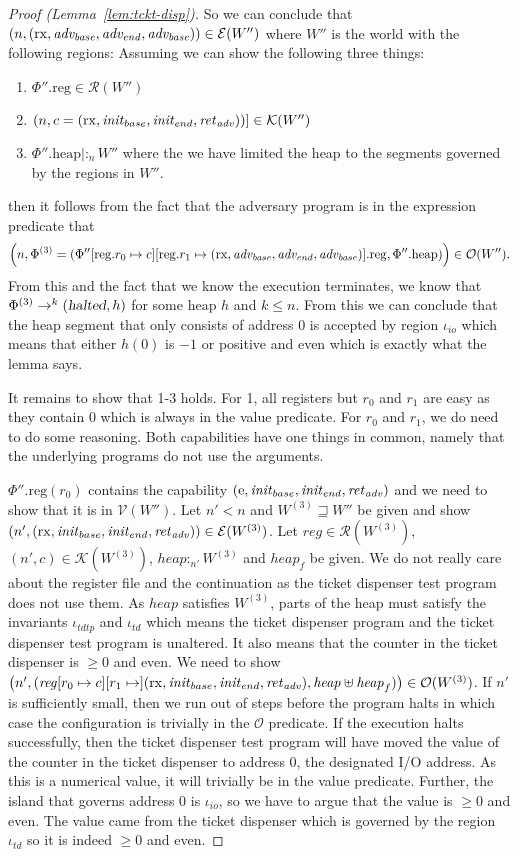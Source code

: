 \documentclass{article}
\newcommand{\update}[2]{[#1 \mapsto #2]}
\newcommand{\var}[1]{\mathit{#1}}
\newcommand{\reg}{\var{reg}}
\newcommand{\heap}{\var{heap}}
\newcommand{\plainproj}[1]{\mathrm{#1}}
\newcommand{\memheap}[1][\Phi]{#1.\plainproj{heap}}
\newcommand{\memreg}[1][\Phi]{#1.\plainproj{reg}}
\newcommand{\updateReg}[3][\Phi]{#1\update{\plainproj{reg}.#2}{#3}}
\newcommand{\halted}{\textsl{halted}}
\newcommand{\future}{\mathbin{\sqsupseteq}}
\newcommand{\heapSat}[3][\heap]{#1 :_{#2} #3}
\newcommand{\asmType}{\plaindom{AsmType}}
\newcommand{\plaindom}[1]{\mathrm{#1}}
\newcommand{\intr}[2]{\mathcal{#1}}
\newcommand{\valueintr}[1]{\intr{V}{#1}}
\newcommand{\exprintr}[1]{\intr{E}{#1}}
\newcommand{\contintr}[1]{\intr{K}{#1}}
\newcommand{\regintr}[1]{\intr{R}{#1}}
\newcommand{\stdvr}{\valueintr{\asmType}}
\newcommand{\stder}{\exprintr{\asmType}}
\newcommand{\stdrr}{\regintr{\asmType}}
\newcommand{\stdkr}{\contintr{\asmType}}
\newcommand{\observations}{\mathcal{O}}
\newcommand{\npair}[2][n]{\left(#1,#2 \right)}
\newcommand{\plainperm}[1]{\mathrm{#1}}
\newcommand{\exec}{\plainperm{rx}}
\newcommand{\entry}{\plainperm{e}}
\newcommand{\step}[1][]{\rightarrow_{#1}}
\begin{document}
\begin{proof}[Proof (Lemma~\ref{lem:tckt-disp})]
So we can conclude that $\npair{(\exec,\advb,\adve,\advb}) \in \stder(W'')$ where $W''$ is the world with the following regions:
Assuming we can show the following three things:
\begin{enumerate}
\item $\memreg[\Phi''] \in \stdrr(W'')$
\item $\npair{c = (\exec,\initb,\inite,\reta)}] \in \stdkr(W'')$
\item $\heapSat[{\memheap[\Phi'']}|]{n}{W''}$ where the we have limited the heap to the segments governed by the regions in $W''$.
\end{enumerate}
then it follows from the fact that the adversary program is in the expression predicate that
\[
\npair{\Phi^{(3)} = (\updateReg[\Phi'']{r_0}{c}[\plainproj{reg}.r_1 \mapsto (\exec,\advb,\adve,\advb)].\plainproj{reg},\memheap[\Phi''])} \in \observations(W'').
\]
From this and the fact that we know the execution terminates, we know that $\Phi^{(3)} \step^k (\halted,h)$ for some heap $h$ and $k \leq n$. From this we can conclude that the heap segment that only consists of address 0 is accepted by region $\iota_{\var{io}}$ which means that either $h(0)$ is $-1$ or positive and even which is exactly what the lemma says.

It remains to show that 1-3 holds. For 1, all registers but $r_0$ and $r_1$ are easy as they contain $0$ which is always in the value predicate. For $r_0$ and $r_1$, we do need to do some reasoning. Both capabilities have one things in common, namely that the underlying programs do not use the arguments.

$\memreg[\Phi''](r_0)$ contains the capability $(\entry,\initb,\inite,\reta)$ and we need to show that it is in $\stdvr(W'')$. Let $n' < n$ and $W^{(3)} \future W''$ be given and show $\npair[n']{(\exec,\initb,\inite,\reta)} \in \stder(W^{(3)})$. Let $\reg \in \stdrr(W^{(3)})$, $\npair[n']{c} \in \stdkr(W^{(3)})$, $\heapSat[\heap]{n'}{W^{(3)}}$ and $\heap_f$ be given. We do not really care about the register file and the continuation as the ticket dispenser test program does not use them. As $\heap$ satisfies $W^{(3)}$, parts of the heap must satisfy the invariants $\iota_{\var{tdtp}}$ and $\iota_{\var{td}}$ which means the ticket dispenser program and the ticket dispenser test program is unaltered. It also means that the counter in the ticket dispenser is $\geq 0$ and even. We need to show $\npair[n']{(\reg[r_0 \mapsto c][r_1 \mapsto ](\exec,\initb,\inite,\reta), \heap \uplus \heap_f)} \in \observations(W^{(3)})$. If $n'$ is sufficiently small, then we run out of steps before the program halts in which case the configuration is trivially in the $\observations$ predicate. If the execution halts successfully, then the ticket dispenser test program will have moved the value of the counter in the ticket dispenser to address 0, the designated I/O address. As this is a numerical value, it will trivially be in the value predicate. Further, the island that governs address 0 is $\iota_{\var{io}}$, so we have to argue that the value is $\geq 0$ and even. The value came from the ticket dispenser which is governed by the region $\iota_{\var{td}}$ so it is indeed $\geq 0$ and even.


\end{proof}
\end{document}
